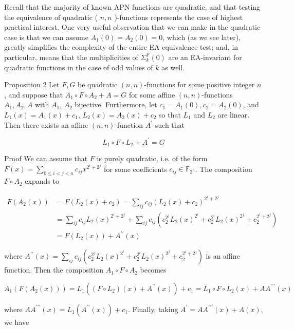 \documentclass[10pt]{article}
\begin{document}
Recall that the majority of known APN functions are quadratic, and that testing the equivalence of quadratic ( $n, n$ )-functions represents the case of highest practical interest. One very useful observation that we can make in the quadratic case is that we can assume $A_{1}(0)=A_{2}(0)=0$, which (as we see later), greatly simplifies the complexity of the entire EA-equivalence test; and, in particular, means that the multiplicities of $\Sigma_{k}^{F}(0)$ are an EA-invariant for quadratic functions in the case of odd values of $k$ as well.

Proposition 2 Let $F, G$ be quadratic $(n, n)$-functions for some positive integer $n$, and suppose that $A_{1} \circ F \circ A_{2}+A=G$ for some affine $(n, n)$-functions $A_{1}, A_{2}, A$ with $A_{1}$, $A_{2}$ bijective. Furthermore, let $c_{1}=A_{1}(0), c_{2}=A_{2}(0)$, and $L_{1}(x)=A_{1}(x)+c_{1}$, $L_{2}(x)=A_{2}(x)+c_{2}$ so that $L_{1}$ and $L_{2}$ are linear. Then there exists an affine $(n, n)$-function $A^{\prime}$ such that

$$
L_{1} \circ F \circ L_{2}+A^{\prime}=G
$$

Proof We can assume that $F$ is purely quadratic, i.e. of the form $F(x)= \sum_{0 \leq i<j<n} c_{i j} x^{2^{i}+2^{j}}$ for some coefficients $c_{i j} \in \mathbb{F}_{2^{n}}$. The composition $F \circ A_{2}$ expands to

$$
\begin{aligned}
F\left(A_{2}(x)\right) & =F\left(L_{2}(x)+c_{2}\right)=\sum_{i j} c_{i j}\left(L_{2}(x)+c_{2}\right)^{2^{i}+2^{j}} \\
& =\sum_{i j} c_{i j} L_{2}(x)^{2^{i}+2^{j}}+\sum_{i j} c_{i j}\left(c_{2}^{2^{j}} L_{2}(x)^{2^{i}}+c_{2}^{2^{i}} L_{2}(x)^{2^{j}}+c_{2}^{2^{i}+2^{j}}\right) \\
& =F\left(L_{2}(x)\right)+A^{\prime \prime}(x)
\end{aligned}
$$

where $A^{\prime \prime}(x)=\sum_{i j} c_{i j}\left(c_{2}^{2^{j}} L_{2}(x)^{2^{i}}+c_{2}^{2^{i}} L_{2}(x)^{2^{j}}+c_{2}^{2^{i}+2^{j}}\right)$ is an affine function. Then the composition $A_{1} \circ F \circ A_{2}$ becomes

$$
A_{1}\left(F\left(A_{2}(x)\right)\right)=L_{1}\left(\left(F \circ L_{2}\right)(x)+A^{\prime \prime}(x)\right)+c_{1}=L_{1} \circ F \circ L_{2}(x)+A A^{\prime \prime \prime}(x)
$$

where $A A^{\prime \prime \prime}(x)=L_{1}\left(A^{\prime \prime}(x)\right)+c_{1}$. Finally, taking $A^{\prime}=A A^{\prime \prime \prime}(x)+A(x)$, we have
\end{document}
